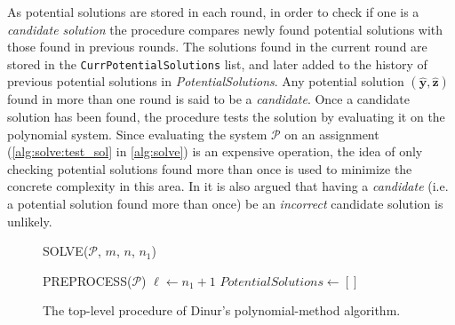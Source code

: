 As potential solutions are stored in each round, in order to check if one is a \textit{candidate solution} the procedure compares newly found potential solutions with those found in previous rounds. The solutions found in the current round are stored in the \texttt{CurrPotentialSolutions} list, and later added to the history of previous potential solutions in \textit{PotentialSolutions}. Any potential solution $(\hat{\mathbf{y}}, \hat{\mathbf{z}})$ found in more than one round is said to be a \textit{candidate}. Once a candidate solution has been found, the procedure tests the solution by evaluating it on the polynomial system. Since evaluating the system $\mathcal{P}$ on an assignment (\cref{alg:solve:test_sol} in \cref{alg:solve}) is an expensive operation, the idea of only checking potential solutions found more than once is used to minimize the concrete complexity in this area. In \cite{eurocrypt-2021-30841} it is also argued that having a \textit{candidate} (i.e. a potential solution found more than once) be an \textit{incorrect} candidate solution is unlikely.
\begin{figure}[ht]
    \centering
    \begin{alg}
        \caption{SOLVE($\mathcal{P}$, $m$, $n$, $n_1$)}
        \label{alg:solve}
         \label{alg:solve:matrix}
        PREPROCESS($\mathcal{P}$)\; \label{alg:solve:preprocess}
        $\ell \gets n_1 + 1$\;
        $PotentialSolutions \gets []$\;
    \end{alg}
    \caption{The top-level procedure of Dinur's polynomial-method algorithm.}
\end{figure}

